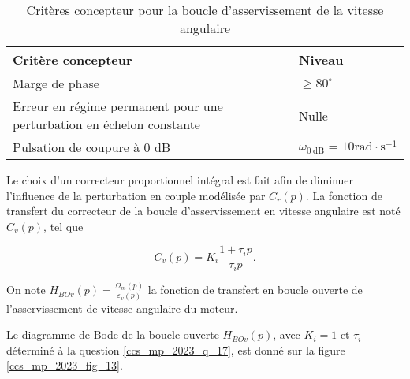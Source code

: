 \begin{table}[h]
\begin{center}
\begin{tabular}{|l|l|}
\hline
Critère concepteur & Niveau \\
\hline
Marge de phase & $\geqslant 80^{\circ}$ \\
\hline
Erreur en régime permanent pour une perturbation en échelon constante & Nulle \\
\hline
Pulsation de coupure à 0 dB & $\omega_{0 \mathrm{~dB}}=10 \mathrm{rad} \cdot \mathrm{s}^{-1}$ \\
\hline
\end{tabular}
\caption{\label{ccs_mp_2023_tab_04}Critères concepteur pour la boucle d'asservissement de la vitesse angulaire}
\end{center}
\end{table}

Le choix d'un correcteur proportionnel intégral est fait afin de diminuer l'influence de la perturbation en couple modélisée par $C_{r}(p)$. La fonction de transfert du correcteur de la boucle d'asservissement en vitesse angulaire est noté $C_{v}(p)$, tel que

$$
C_{v}(p)=K_{i} \frac{1+\tau_{i} p}{\tau_{i} p} .
$$

On note $H_{B O v}(p)=\frac{\Omega_{m}(p)}{\varepsilon_{v}(p)}$ la fonction de transfert en boucle ouverte de l'asservissement de vitesse angulaire du moteur.

\ifprof
\begin{corrige}
\end{corrige}
\else
\fi


Le diagramme de Bode de la boucle ouverte $H_{B O v}(p)$, avec $K_{i}=1$ et $\tau_{i}$ déterminé à la question \ref{ccs_mp_2023_q_17}, est donné sur la figure \ref{ccs_mp_2023_fig_13}.



